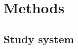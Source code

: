 \documentclass{article}\usepackage[]{graphicx}\usepackage[]{color}
\begin{document}



\section*{Methods}
\subsection{Study system}
\end{document}
